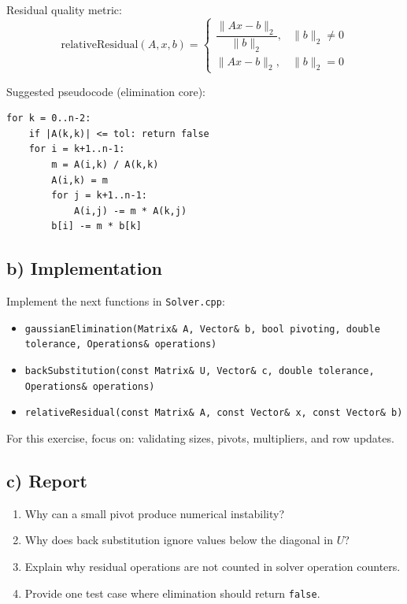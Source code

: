 \documentclass[11pt,a4paper]{article}
\begin{document}
Residual quality metric:
$$
\text{relativeResidual}(A,x,b)=
\begin{cases}
\dfrac{\|Ax-b\|_2}{\|b\|_2}, & \|b\|_2 \neq 0 \\
\|Ax-b\|_2, & \|b\|_2 = 0
\end{cases}
$$

Suggested pseudocode (elimination core):
\begin{verbatim}
for k = 0..n-2:
    if |A(k,k)| <= tol: return false
    for i = k+1..n-1:
        m = A(i,k) / A(k,k)
        A(i,k) = m
        for j = k+1..n-1:
            A(i,j) -= m * A(k,j)
        b[i] -= m * b[k]
\end{verbatim}

\subsection*{b) Implementation}
Implement the next functions in \texttt{Solver.cpp}:
\begin{itemize}[leftmargin=*]
    \item \texttt{gaussianElimination(Matrix\& A, Vector\& b, bool pivoting, double tolerance, Operations\& operations)}
    \item \texttt{backSubstitution(const Matrix\& U, Vector\& c, double tolerance, Operations\& operations)}
    \item \texttt{relativeResidual(const Matrix\& A, const Vector\& x, const Vector\& b)}
\end{itemize}
\par

For this exercise, focus on: validating sizes, pivots, multipliers, and row updates.

\subsection*{c) Report}
\begin{enumerate}[leftmargin=*]
    \item Why can a small pivot produce numerical instability?
    \item Why does back substitution ignore values below the diagonal in $U$?
    \item Explain why residual operations are not counted in solver operation counters.
    \item Provide one test case where elimination should return \texttt{false}.
\end{enumerate}
\par
\end{document}
